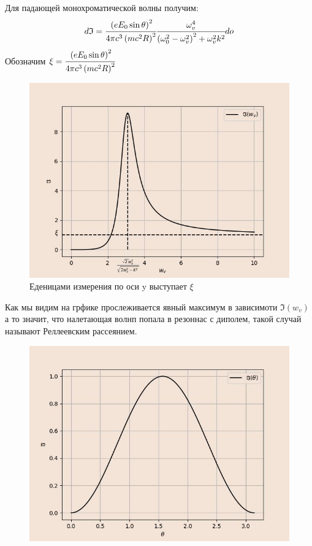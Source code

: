 Для падающей монохроматической волны получим:
\begin{equation}
    d\mathfrak{I} =  \cfrac{\left( eE_0 \sin \theta \right)^2}{4\pi c^3 \left( mc^2R \right)^2} 
    \cfrac{\omega_v^4}{\left( \omega_0^2 - \omega_v^2  \right)^2 + \omega_v^2 k^2 } do
\end{equation}
Обозначим $\xi = \cfrac{\left( eE_0 \sin \theta \right)^2}{4\pi c^3 \left( mc^2R \right)^2}$
\begin{figure}[H]
    \centering
    \includegraphics[width=1\textwidth]{sours_img/omega.jpg}
    \caption{Еденицами измерения по оси y выступает $\xi$}
    \label{pict:j_w}
\end{figure}

Как мы видим на грфике прослеживается явный максимум в зависимоти $\mathfrak{I}(w_v)$ 
а то значит, что налетающая волнп попала в резоннас с диполем, такой случай
называют Реллеевским рассеянием. 

\begin{figure}[H]
    \centering
    \includegraphics[trim={0 0 0 0},clip,width=1\textwidth]{sours_img/phi.jpg}
    \label{pict:J_phi}
\end{figure}


